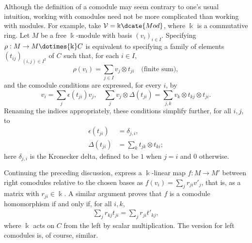 Although the definition of a comodule may seem contrary to one's usual
intuition, working with comodules need not be more complicated than working
with modules. For example, take $\mathcal{V}=\Bbbk\dcate{Mod}$, where
$\Bbbk$ is a commutative ring. Let $M$ be a free $\Bbbk$-module with basis
$(v_i)_{i\in I}$. Specifying $\rho:M\to M\dotimes{\Bbbk}C$ is equivalent to
specifying a family of elements $(t_{ij})_{(i,j)\in I^2}$ of $C$ such that,
for each $i\in I$,
\begin{equation*}
	\rho(v_i) = \sum_{j \in I} v_j \otimes t_{ji} \quad \text{(finite sum)},
\end{equation*}
and the comodule conditions are expressed, for every $i$, by
\begin{equation*}
	v_i = \sum_j \epsilon(t_{ji}) v_j, \quad \sum_j v_j \otimes \Delta(t_{ji}) = \sum_{j, k} v_k \otimes t_{kj}  \otimes t_{ji}.
\end{equation*}
Renaming the indices appropriately, these conditions simplify further, for
all $i,j$, to
\begin{equation}\label{eqn:comodule-matrix}
	\begin{aligned}
		\epsilon(t_{ji}) & = \delta_{j, i}, \\
		\Delta(t_{ji}) & = \sum_k t_{jk} \otimes t_{ki};
	\end{aligned}
\end{equation}
here $\delta_{j,i}$ is the Kronecker delta, defined to be $1$ when $j=i$ and
$0$ otherwise.

Continuing the preceding discussion, express a $\Bbbk$-linear map
$f:M\to M'$ between right comodules relative to the chosen bases as
$f(v_i)=\sum_jr_{ji}v'_j$, that is, as a matrix with $r_{ji}\in\Bbbk$. A
similar argument proves that $f$ is a comodule homomorphism if and only if,
for all $i,k$,
\begin{equation*}\begin{gathered}
	\sum_j r_{kj} t_{ji} = \sum_j r_{ji} t'_{kj},
\end{gathered}\end{equation*}
where $\Bbbk$ acts on $C$ from the left by scalar multiplication. The version
for left comodules is, of course, similar.

